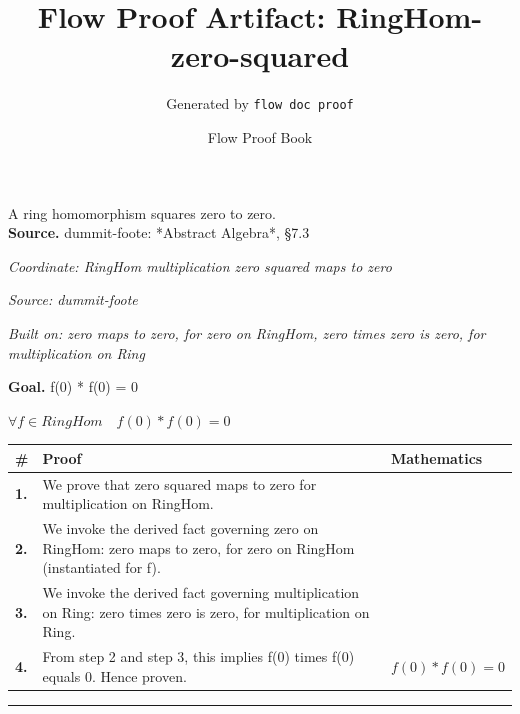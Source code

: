 \documentclass[11pt]{article}
\title{Flow Proof Artifact: RingHom-zero-squared}
\author{Generated by \texttt{flow doc proof}}
\date{Flow Proof Book}
\theoremstyle{definition}
\begin{document}
\maketitle
A ring homomorphism squares zero to zero.\\[0.5em]
\textbf{Source.} dummit-foote: *Abstract Algebra*, §7.3\\[0.5em]
\bigskip
{}\par
\smallskip\noindent\textit{Coordinate: RingHom \cdot multiplication \cdot zero squared maps to zero}\par
\smallskip\noindent\textit{Source: dummit-foote}\par
\smallskip\noindent\textit{Built on: zero maps to zero, for zero on RingHom, zero times zero is zero, for multiplication on Ring}\par
\medskip
\noindent\textbf{Goal.} f(0) * f(0) = 0\par
\noindent$\displaystyle \forall f \in RingHom\quad f(0) * f(0) = 0$\par
\medskip
\noindent
\begin{tabular}{@{} >{\raggedright\arraybackslash}p{} >{\raggedright\arraybackslash}p{} >{\raggedleft\arraybackslash}p{} @{}}
\textbf{\#} & \textbf{Proof} & \textbf{Mathematics} \\
\midrule
\textbf{1.} & We prove that zero squared maps to zero for multiplication on RingHom. & \\[0.45em]
\textbf{2.} & We invoke the derived fact governing zero on RingHom: zero maps to zero, for zero on RingHom (instantiated for f). & \\[0.45em]
\textbf{3.} & We invoke the derived fact governing multiplication on Ring: zero times zero is zero, for multiplication on Ring. & \\[0.45em]
\textbf{4.} & From step 2 and step 3, this implies f(0) times f(0) equals 0. Hence proven. & $\displaystyle f(0) * f(0) = 0$ \\[0.45em]
\bottomrule
\end{tabular}
\label{thm:RingHom-multiplication-zero_squared_maps_to_zero}
\par\medskip\hrule
\end{document}

